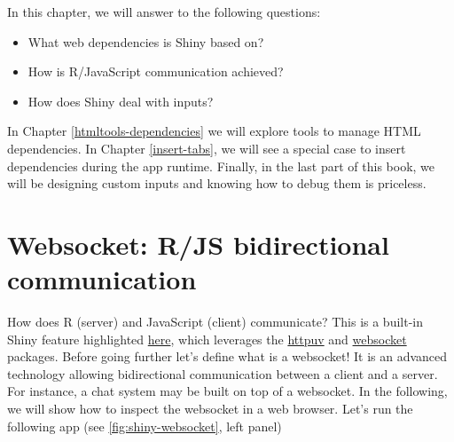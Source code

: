 \documentclass[
]{book}
\newenvironment{Shaded}{\begin{snugshade}}{\end{snugshade}}
\newcommand{\ControlFlowTok}[1]{\textcolor[rgb]{0.13,0.29,0.53}{\textbf{#1}}}
\newcommand{\DataTypeTok}[1]{\textcolor[rgb]{0.13,0.29,0.53}{#1}}
\newcommand{\KeywordTok}[1]{\textcolor[rgb]{0.13,0.29,0.53}{\textbf{#1}}}
\newcommand{\NormalTok}[1]{#1}
\newcommand{\OperatorTok}[1]{\textcolor[rgb]{0.81,0.36,0.00}{\textbf{#1}}}
\newcommand{\OtherTok}[1]{\textcolor[rgb]{0.56,0.35,0.01}{#1}}
\newcommand{\StringTok}[1]{\textcolor[rgb]{0.31,0.60,0.02}{#1}}
\providecommand{\tightlist}{%
  \setlength{\itemsep}{0pt}\setlength{\parskip}{0pt}}
\begin{document}
In this chapter, we will answer to the following questions:

\begin{itemize}
\tightlist
\item
  What web dependencies is Shiny based on?
\item
  How is R/JavaScript communication achieved?
\item
  How does Shiny deal with inputs?
\end{itemize}

In Chapter \ref{htmltools-dependencies} we will explore tools to manage HTML dependencies. In Chapter \ref{insert-tabs}, we will see a special case to insert dependencies during the app runtime. Finally, in the last part of this book, we will be designing custom inputs and knowing how to debug them is priceless.

\hypertarget{shiny-websocket}{%
\section{Websocket: R/JS bidirectional communication}\label{shiny-websocket}}

How does R (server) and JavaScript (client) communicate? This is a built-in Shiny feature highlighted \href{https://github.com/rstudio/shiny}{here}, which leverages the \href{https://github.com/rstudio/httpuv}{httpuv} and \href{https://github.com/rstudio/websocket}{websocket} packages. Before going further let's define what is a websocket! It is an advanced technology allowing bidirectional communication between a client and a server. For instance, a chat system may be built on top of a websocket. In the following, we will show how to inspect the websocket in a web browser. Let's run the following app (see \ref{fig:shiny-websocket}, left panel)

\begin{Shaded}
\end{Shaded}
\end{document}
